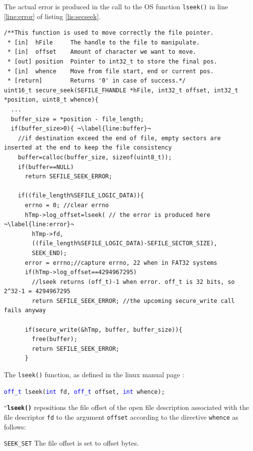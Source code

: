 The actual error is produced in the call to the OS function \texttt{lseek()} in line \ref{line:error} of listing \ref{lis:secseek}. 
\begin{lstlisting}[style=customc, float=htb, caption={FAT32 Error's origin at secure\_seek}, label = {lis:secseek}, escapechar=¬]
/**This function is used to move correctly the file pointer.
 * [in]  hFile     The handle to the file to manipulate.
 * [in]  offset    Amount of character we want to move.
 * [out] position  Pointer to int32_t to store the final pos.
 * [in]  whence    Move from file start, end or current pos.
 * [return]        Returns '0' in case of success.*/
uint16_t secure_seek(SEFILE_FHANDLE *hFile, int32_t offset, int32_t *position, uint8_t whence){
  ...  
  buffer_size = *position - file_length;
  if(buffer_size>0){ ¬\label{line:buffer}¬
    //if destination exceed the end of file, empty sectors are inserted at the end to keep the file consistency
    buffer=calloc(buffer_size, sizeof(uint8_t));
    if(buffer==NULL)
      return SEFILE_SEEK_ERROR;
    
    if((file_length%SEFILE_LOGIC_DATA)){
      errno = 0; //clear errno 
      hTmp->log_offset=lseek( // the error is produced here ¬\label{line:error}¬
        hTmp->fd, 
        ((file_length%SEFILE_LOGIC_DATA)-SEFILE_SECTOR_SIZE), 
        SEEK_END);
      error = errno;//capture errno, 22 when in FAT32 systems
      if(hTmp->log_offset==4294967295)
        //lseek returns (off_t)-1 when error. off_t is 32 bits, so 2^32-1 = 4294967295
        return SEFILE_SEEK_ERROR; //the upcoming secure_write call fails anyway
      
      if(secure_write(&hTmp, buffer, buffer_size)){
        free(buffer);
        return SEFILE_SEEK_ERROR;
      }   
\end{lstlisting}

\vspace{15pt}
The \texttt{lseek()} function, as defined in the linux manual page \cite{lseek}:

\texttt{\textcolor{blue}{off\_t} lseek(\textcolor{blue}{int} fd, \textcolor{blue}{off\_t} offset, \textcolor{blue}{int} whence);}

``\textbf{\texttt{lseek()}} repositions the file offset of the open file description
       associated with the file descriptor \texttt{fd} to the argument \texttt{offset}
       according to the directive \texttt{whence} as follows:
       
       \texttt{SEEK\_SET} The file offset is set to offset bytes.
       
